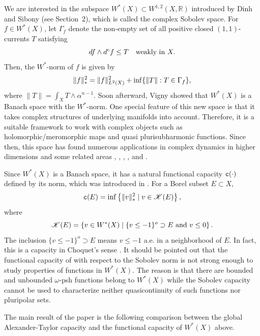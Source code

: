 \documentclass{amsart}
\newcommand{\al}{\alpha}
\newcommand{\om}{\omega}
\newcommand{\tc}{{\tt c}}
\newcommand{\Ga}{\Gamma}
\newcommand{\bR}{\mathbb{R}}
\newcommand{\cali}[1]{\mathscr{#1}}
\newcommand{\Kc}{\cali{K}}
\theoremstyle{definition}
\numberwithin{thm}{section}
\numberwithin{equation}{section}
\renewcommand{\[}{\begin{equation}}
\renewcommand{\]}{\end{equation}}
\newcommand{\rv}{\;\rvert\;}
\newcommand{\wed}{\wedge}
\begin{document}
We are interested in the subspace $W^*(X) \subset W^{1,2}(X,\bR)$ introduced by Dinh and Sibony \cite{DS} (see Section~2), which is  called the  complex Sobolev space.  For $f\in W^*(X)$, let $\Ga_f$  denote the non-empty set of all positive closed $(1,1)$-currents $T$ satisfying
\[\notag\label{eq:w-ineq-intro}
	df \wed d^c f  \leq T \quad\text{weakly in } X.
\] 
Then, the $W^*$-norm of $f$ is given by
\[\notag\label{eq:w-norm-intro}
	\|f\|_*^2 = \|f\|_{L^2(X)}^2 + \inf\{\|T\| : T \in \Ga_f\},
\]
where  
$
	\|T\| = \int_X T \wed\al^{n-1}.
$ 
Soon afterward, Vigny \cite{Vigny} showed that $W^*(X)$ is a Banach space with the $W^*$-norm. One special feature of this new space is that it takes  complex structures of underlying manifolds into account. Therefore, it is a suitable framework to work with complex objects such as holomorphic/meromorphic maps and quasi plurisubharmonic functions. Since then, this space has found numerous applications in complex dynamics in higher dimensions and some related areas  \cite{BiD23},  \cite{DKW}, \cite{DNV25}, \cite{Vig15}, \cite{Vu20} and \cite{WZ}. 

Since $W^*(X)$ is a Banach space, it has  a natural  functional capacity $\tc(\cdot)$ defined by its norm, which was introduced in \cite{Vigny}. For a Borel subset $E\subset X$, 
\[\label{eq:intro-cap-defn}\notag
	{\tt c}(E) = \inf 
	\left\{ \| v \|_*^2 \;\rvert\;  v\in \Kc(E)
	\right\},
\] 
where
\[\label{eq:intro-ke-cap}\notag
 	\Kc(E) = \left\{ v \in W^*(X) \rv \{v \leq  -1\}^o \supset E \text{ and } v\leq 0 \right\}.
\]
The inclusion $ \{v \leq  -1\}^o \supset E$ means $v\leq -1$ a.e. in a neighborhood of $E$. In fact, this is a capacity in Choquet's sense \cite[Theorem~30]{Vigny}. It should be pointed out that the functional capacity of  with respect to the Sobolev norm is not strong enough to study properties of functions in $W^*(X)$. The reason is that there are bounded and unbounded $\om$-psh functions belong to $W^*(X)$ while the Sobolev capacity cannot be used to characterize neither quasicontinuity of such functions nor pluripolar sets.

The main result of the paper is the following comparison between the global Alexander-Taylor capacity and the functional capacity of $W^*(X)$ above.
\end{document}
